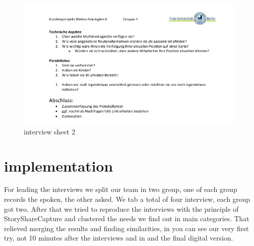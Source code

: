 \clearpage

\begin{figure}[!h]
	\centering
	\includegraphics[width=\textwidth, trim= 0mm 170mm 0mm 30mm,clip, page=2,scale=0.9]{images/Interviewbogen2.png}
	\caption{interview sheet 2}
	\label{fig:interview2}
\end{figure}

\section{implementation}

For leading the interviews we split our team in two group, one of each group records the spoken, the other asked. We tab a total
of four interview, each group got two. After that we tried to reproduce the interviews with the principle of StoryShareCapture and
clustered the needs we find out in main categories. That relieved merging the results and finding similarities, in
 you can see our very first try, not 10 minutes after the interviews and in   and
 the final digital version.


